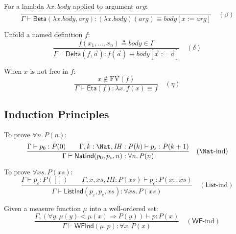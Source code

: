 \begin{definition}
For a lambda $\lambda x.\, \mathit{body}$ applied to argument $\mathit{arg}$:
\[
\frac{}{\Gamma \vdash \mathsf{Beta}(\lambda x.\mathit{body}, \mathit{arg})
  : (\lambda x.\mathit{body})(\mathit{arg}) \equiv \mathit{body}[x := \mathit{arg}]}
  \quad (\beta)
\]
\end{definition}

\begin{definition}
Unfold a named definition $f$:
\[
\frac{f(x_1, \ldots, x_n) \triangleq \mathit{body} \in \Gamma}
     {\Gamma \vdash \mathsf{Delta}(f, \vec{a})
       : f(\vec{a}) \equiv \mathit{body}[\vec{x} := \vec{a}]}
     \quad (\delta)
\]
\end{definition}

\begin{definition}
When $x$ is not free in $f$:
\[
\frac{x \notin \mathrm{FV}(f)}
     {\Gamma \vdash \mathsf{Eta}(f)
       : \lambda x.\, f(x) \equiv f}
     \quad (\eta)
\]
\end{definition}

\subsection{Induction Principles}

\begin{definition}
To prove $\forall n.\, P(n)$:
\[
\frac{\Gamma \vdash p_0 : P(0) \qquad
      \Gamma, k : \Nat, \mathit{IH}: P(k) \vdash p_s : P(k+1)}
     {\Gamma \vdash \mathsf{NatInd}(p_0, p_s, n) : \forall n.\, P(n)}
     \quad (\Nat\text{-ind})
\]
\end{definition}

\begin{definition}
To prove $\forall \mathit{xs}.\, P(\mathit{xs})$:
\[
\frac{\Gamma \vdash p_\varepsilon : P([]) \qquad
      \Gamma, x, \mathit{xs}, \mathit{IH}: P(\mathit{xs}) \vdash p_c
        : P(x :: \mathit{xs})}
     {\Gamma \vdash \mathsf{ListInd}(p_\varepsilon, p_c, \mathit{xs})
       : \forall \mathit{xs}.\, P(\mathit{xs})}
     \quad (\mathsf{List}\text{-ind})
\]
\end{definition}

\begin{definition}
Given a measure function $\mu$ into a well-ordered set:
\[
\frac{\Gamma, (\forall y.\, \mu(y) < \mu(x) \Rightarrow P(y)) \vdash p : P(x)}
     {\Gamma \vdash \mathsf{WFInd}(\mu, p) : \forall x.\, P(x)}
     \quad (\mathsf{WF}\text{-ind})
\]
\end{definition}

